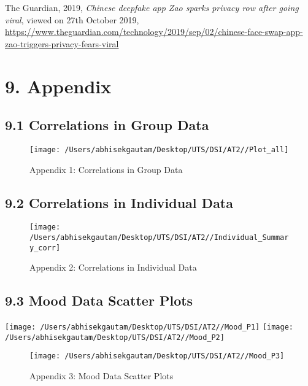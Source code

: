 \documentclass[
]{article}
\begin{document}
The Guardian, 2019, \emph{Chinese deepfake app Zao sparks privacy row
after going viral}, viewed on 27th October 2019,
\url{https://www.theguardian.com/technology/2019/sep/02/chinese-face-swap-app-zao-triggers-privacy-fears-viral}

\hypertarget{appendix}{%
\section{9. Appendix}\label{appendix}}

\hypertarget{correlations-in-group-data}{%
\subsection{9.1 Correlations in Group
Data}\label{correlations-in-group-data}}

\begin{figure}

{\centering \texttt{[image: /Users/abhisekgautam/Desktop/UTS/DSI/AT2//Plot\_all]} 

}

\caption{\label{fig:figs}Appendix 1: Correlations in Group Data}\label{fig:add_picture97}
\end{figure}

\hypertarget{correlations-in-individual-data}{%
\subsection{9.2 Correlations in Individual
Data}\label{correlations-in-individual-data}}

\begin{figure}

{\centering \texttt{[image: /Users/abhisekgautam/Desktop/UTS/DSI/AT2//Individual\_Summary\_corr]} 

}

\caption{\label{fig:figs}Appendix 2: Correlations in Individual Data}\label{fig:add_picture96}
\end{figure}

\hypertarget{mood-data-scatter-plots}{%
\subsection{9.3 Mood Data Scatter Plots}\label{mood-data-scatter-plots}}

\texttt{[image: /Users/abhisekgautam/Desktop/UTS/DSI/AT2//Mood\_P1]}
\texttt{[image: /Users/abhisekgautam/Desktop/UTS/DSI/AT2//Mood\_P2]}

\begin{figure}

{\centering \texttt{[image: /Users/abhisekgautam/Desktop/UTS/DSI/AT2//Mood\_P3]} 

}

\caption{\label{fig:figs}Appendix 3: Mood Data Scatter Plots}\label{fig:add_picture94}
\end{figure}
\end{document}
